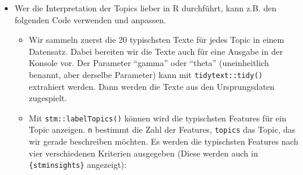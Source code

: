 \documentclass[
]{book}
\providecommand{\tightlist}{%
  \setlength{\itemsep}{0pt}\setlength{\parskip}{0pt}}
\begin{document}
\begin{itemize}
\tightlist
\item
  Wer die Interpretation der Topics lieber in R durchführt, kann z.B. den folgenden Code verwenden und anpassen.

  \begin{itemize}
  \tightlist
  \item
    Wir sammeln zuerst die 20 typischsten Texte für jedes Topic in einem Datensatz. Dabei bereiten wir die Texte auch für eine Ausgabe in der Konsole vor. Der Parameter ``gamma'' oder ``theta'' (uneinheitlich benannt, aber derselbe Parameter) kann mit \texttt{tidytext::tidy()} extrahiert werden. Dann werden die Texte aus den Ursprungsdaten zugespielt.
  \item
    Mit \texttt{stm::labelTopics()} können wird die typischsten Features für ein Topic anzeigen. \texttt{n} bestimmt die Zahl der Features, \texttt{topics} das Topic, das wir gerade beschreiben möchten. Es werden die typischsten Features nach vier verschiedenen Kriterien ausgegeben (Diese werden auch in \texttt{\{stminsights\}} angezeigt):


\end{itemize}
\end{itemize}
\end{document}
